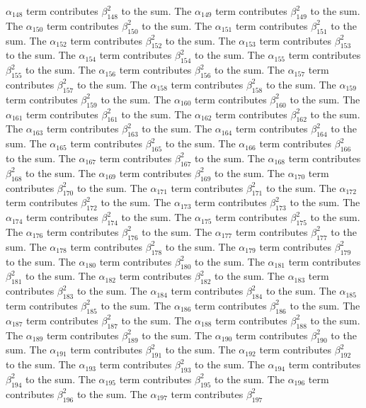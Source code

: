\begin{lemma}
$\alpha_{148}$ term contributes $\beta_{148}^{2}$ to the sum. The $\alpha_{149}$ term contributes $\beta_{149}^{2}$ to the sum. The $\alpha_{150}$ term contributes $\beta_{150}^{2}$ to the sum. The $\alpha_{151}$ term contributes $\beta_{151}^{2}$ to the sum. The $\alpha_{152}$ term contributes $\beta_{152}^{2}$ to the sum. The $\alpha_{153}$ term contributes $\beta_{153}^{2}$ to the sum. The $\alpha_{154}$ term contributes $\beta_{154}^{2}$ to the sum. The $\alpha_{155}$ term contributes $\beta_{155}^{2}$ to the sum. The $\alpha_{156}$ term contributes $\beta_{156}^{2}$ to the sum. The $\alpha_{157}$ term contributes $\beta_{157}^{2}$ to the sum. The $\alpha_{158}$ term contributes $\beta_{158}^{2}$ to the sum. The $\alpha_{159}$ term contributes $\beta_{159}^{2}$ to the sum. The $\alpha_{160}$ term contributes $\beta_{160}^{2}$ to the sum. The $\alpha_{161}$ term contributes $\beta_{161}^{2}$ to the sum. The $\alpha_{162}$ term contributes $\beta_{162}^{2}$ to the sum. The $\alpha_{163}$ term contributes $\beta_{163}^{2}$ to the sum. The $\alpha_{164}$ term contributes $\beta_{164}^{2}$ to the sum. The $\alpha_{165}$ term contributes $\beta_{165}^{2}$ to the sum. The $\alpha_{166}$ term contributes $\beta_{166}^{2}$ to the sum. The $\alpha_{167}$ term contributes $\beta_{167}^{2}$ to the sum. The $\alpha_{168}$ term contributes $\beta_{168}^{2}$ to the sum. The $\alpha_{169}$ term contributes $\beta_{169}^{2}$ to the sum. The $\alpha_{170}$ term contributes $\beta_{170}^{2}$ to the sum. The $\alpha_{171}$ term contributes $\beta_{171}^{2}$ to the sum. The $\alpha_{172}$ term contributes $\beta_{172}^{2}$ to the sum. The $\alpha_{173}$ term contributes $\beta_{173}^{2}$ to the sum. The $\alpha_{174}$ term contributes $\beta_{174}^{2}$ to the sum. The $\alpha_{175}$ term contributes $\beta_{175}^{2}$ to the sum. The $\alpha_{176}$ term contributes $\beta_{176}^{2}$ to the sum. The $\alpha_{177}$ term contributes $\beta_{177}^{2}$ to the sum. The $\alpha_{178}$ term contributes $\beta_{178}^{2}$ to the sum. The $\alpha_{179}$ term contributes $\beta_{179}^{2}$ to the sum. The $\alpha_{180}$ term contributes $\beta_{180}^{2}$ to the sum. The $\alpha_{181}$ term contributes $\beta_{181}^{2}$ to the sum. The $\alpha_{182}$ term contributes $\beta_{182}^{2}$ to the sum. The $\alpha_{183}$ term contributes $\beta_{183}^{2}$ to the sum. The $\alpha_{184}$ term contributes $\beta_{184}^{2}$ to the sum. The $\alpha_{185}$ term contributes $\beta_{185}^{2}$ to the sum. The $\alpha_{186}$ term contributes $\beta_{186}^{2}$ to the sum. The $\alpha_{187}$ term contributes $\beta_{187}^{2}$ to the sum. The $\alpha_{188}$ term contributes $\beta_{188}^{2}$ to the sum. The $\alpha_{189}$ term contributes $\beta_{189}^{2}$ to the sum. The $\alpha_{190}$ term contributes $\beta_{190}^{2}$ to the sum. The $\alpha_{191}$ term contributes $\beta_{191}^{2}$ to the sum. The $\alpha_{192}$ term contributes $\beta_{192}^{2}$ to the sum. The $\alpha_{193}$ term contributes $\beta_{193}^{2}$ to the sum. The $\alpha_{194}$ term contributes $\beta_{194}^{2}$ to the sum. The $\alpha_{195}$ term contributes $\beta_{195}^{2}$ to the sum. The $\alpha_{196}$ term contributes $\beta_{196}^{2}$ to the sum. The $\alpha_{197}$ term contributes $\beta_{197}^{2}$ 
\end{lemma}
